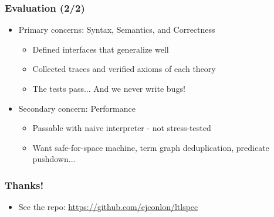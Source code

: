 \documentclass[12pt,aspectratio=169]{beamer}
\begin{document}
\begin{frame}
\frametitle{Evaluation (2/2)}
\begin{itemize}
  \item Primary concerns: Syntax, Semantics, and Correctness
    \begin{itemize}
      \item Defined interfaces that generalize well
      \item Collected traces and verified axioms of each theory
      \item The tests pass... And we never write bugs!
    \end{itemize}
  \item Secondary concern: Performance
    \begin{itemize}
      \item Passable with naive interpreter - not stress-tested
      \item Want safe-for-space machine, term graph deduplication, predicate pushdown...
    \end{itemize}
\end{itemize}
\end{frame}

\begin{frame}
\frametitle{Thanks!}
\begin{itemize}
  \item See the repo: \url{https://github.com/ejconlon/ltlspec}
\end{itemize}
\end{frame}
\end{document}
